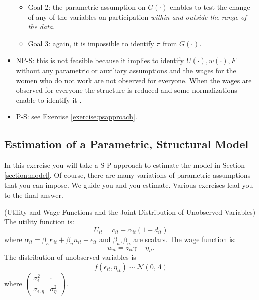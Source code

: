 \begin{exercise}
\begin{itemize}
\begin{itemize}
\item Goal 2: the parametric assumption on $G(\cdot)$ enables to test the change of any of the variables on participation \emph{within and outside the range of the data}.
\item Goal 3: again, it is impossible to identify $\pi$ from $G(\cdot)$.
\end{itemize}
\item NP-S: this is not feasible because it implies to identify $U(\cdot), w(\cdot), F$ without any parametric or auxiliary assumptions and the wages for the women who do not work are not observed for everyone. When the wages are observed for everyone the structure is reduced and some normalizations enable to identify it \citep[see][]{matzkin1993nonparametric}.
\item P-S: see Exercise \ref{exercise:psapproach}.
\end{itemize}
\end{exercise}

\subsection{Estimation of a Parametric, Structural Model}
In this exercise you will take a S-P approach to estimate the model in Section \ref{section:model}. Of course, there are many variations of parametric assumptions that you can impose. We guide you and you estimate. Various exercises lead you to the final answer. 

\begin{assumption} (Utility and Wage Functions and the Joint Distribution of Unobserved Variables) \label{assumption:utwajo}
The utility function is:
\begin{equation}
U_{it} = c_{it} + \alpha_{it} (1 - d_{it})
\end{equation}
\noindent where $\alpha_{it} = \beta_{\kappa} \kappa_{it} + \beta_{n} n_{it} + \epsilon_{it}$ and $\beta_{\kappa},\beta_{n}$ are scalars. The wage function is:
\begin{equation}
w_{it} = z_{it} \gamma + \eta_{it}.
\end{equation}
\noindent The distribution of unobserved variables is
\begin{equation}
f \left( \epsilon_{it}, \eta_{it} \right) \sim \mathcal{N} \left( 0, \Lambda \right)
\end{equation}
where $\left( \begin{array}{cc} 
\sigma_{\epsilon}^2 & \cdot \\
\sigma_{\epsilon, \eta} & \sigma_{\eta}^2
\end{array} \right)$.  
\end{assumption}

